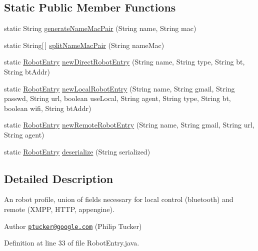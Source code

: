 \subsection*{Static Public Member Functions}
\begin{DoxyCompactItemize}
\item 
static String \hyperlink{classcom_1_1cellbots_1_1_robot_entry_a429a1745ae1e08ce137c1f71bad1dbcd}{generate\-Name\-Mac\-Pair} (String name, String mac)
\item 
static String\mbox{[}$\,$\mbox{]} \hyperlink{classcom_1_1cellbots_1_1_robot_entry_a4c35f6e548df502c97e0fa27016369b0}{split\-Name\-Mac\-Pair} (String name\-Mac)
\item 
static \hyperlink{classcom_1_1cellbots_1_1_robot_entry}{Robot\-Entry} \hyperlink{classcom_1_1cellbots_1_1_robot_entry_a2500d90a3e5c015545095c685ca68a08}{new\-Direct\-Robot\-Entry} (String name, String type, String bt, String bt\-Addr)
\item 
static \hyperlink{classcom_1_1cellbots_1_1_robot_entry}{Robot\-Entry} \hyperlink{classcom_1_1cellbots_1_1_robot_entry_a409b5d27469ce98bef6eb02eca00d030}{new\-Local\-Robot\-Entry} (String name, String gmail, String passwd, String url, boolean use\-Local, String agent, String type, String bt, boolean wifi, String bt\-Addr)
\item 
static \hyperlink{classcom_1_1cellbots_1_1_robot_entry}{Robot\-Entry} \hyperlink{classcom_1_1cellbots_1_1_robot_entry_a38ca2cf83192f3356b9a9587d56a23f7}{new\-Remote\-Robot\-Entry} (String name, String gmail, String url, String agent)
\item 
static \hyperlink{classcom_1_1cellbots_1_1_robot_entry}{Robot\-Entry} \hyperlink{classcom_1_1cellbots_1_1_robot_entry_aae86645a9a04c52bb5083e905ccfeb58}{deserialize} (String serialized)
\end{DoxyCompactItemize}


\subsection{Detailed Description}
An robot profile, union of fields necessary for local control (bluetooth) and remote (X\-M\-P\-P, H\-T\-T\-P, appengine).

\begin{DoxyAuthor}{Author}
\href{mailto:ptucker@google.com}{\tt ptucker@google.\-com} (Philip Tucker) 
\end{DoxyAuthor}


Definition at line 33 of file Robot\-Entry.\-java.



